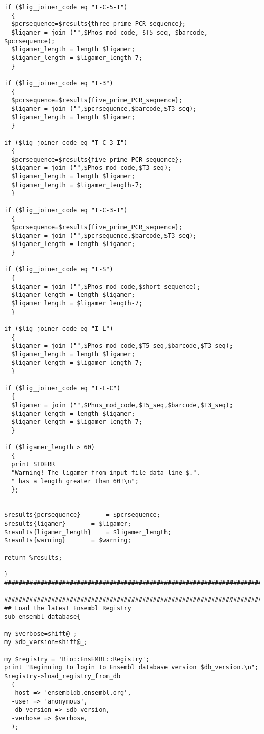 \begin{lstlisting}
if ($lig_joiner_code eq "T-C-5-T")
  {
  $pcrsequence=$results{three_prime_PCR_sequence};
  $ligamer = join ("",$Phos_mod_code, $T5_seq, $barcode, $pcrsequence);
  $ligamer_length = length $ligamer;
  $ligamer_length = $ligamer_length-7;
  }

if ($lig_joiner_code eq "T-3")
  {
  $pcrsequence=$results{five_prime_PCR_sequence};
  $ligamer = join ("",$pcrsequence,$barcode,$T3_seq);
  $ligamer_length = length $ligamer;
  }

if ($lig_joiner_code eq "T-C-3-I")
  {
  $pcrsequence=$results{five_prime_PCR_sequence};
  $ligamer = join ("",$Phos_mod_code,$T3_seq);
  $ligamer_length = length $ligamer;
  $ligamer_length = $ligamer_length-7;
  }

if ($lig_joiner_code eq "T-C-3-T")
  {
  $pcrsequence=$results{five_prime_PCR_sequence};
  $ligamer = join ("",$pcrsequence,$barcode,$T3_seq);
  $ligamer_length = length $ligamer;
  }

if ($lig_joiner_code eq "I-S")
  {
  $ligamer = join ("",$Phos_mod_code,$short_sequence);
  $ligamer_length = length $ligamer;
  $ligamer_length = $ligamer_length-7;
  }

if ($lig_joiner_code eq "I-L")
  {
  $ligamer = join ("",$Phos_mod_code,$T5_seq,$barcode,$T3_seq);
  $ligamer_length = length $ligamer;
  $ligamer_length = $ligamer_length-7;
  }

if ($lig_joiner_code eq "I-L-C")
  {
  $ligamer = join ("",$Phos_mod_code,$T5_seq,$barcode,$T3_seq);
  $ligamer_length = length $ligamer;
  $ligamer_length = $ligamer_length-7;
  }

if ($ligamer_length > 60)
  {
  print STDERR
  "Warning! The ligamer from input file data line $.".
  " has a length greater than 60!\n";
  };


$results{pcrsequence}		= $pcrsequence;
$results{ligamer}		= $ligamer;
$results{ligamer_length}	= $ligamer_length;
$results{warning}		= $warning;

return %results;

}
################################################################################

################################################################################
## Load the latest Ensembl Registry
sub ensembl_database{

my $verbose=shift@_;
my $db_version=shift@_;

my $registry = 'Bio::EnsEMBL::Registry';
print "Beginning to login to Ensembl database version $db_version.\n";
$registry->load_registry_from_db
  (
  -host => 'ensembldb.ensembl.org',
  -user => 'anonymous',
  -db_version => $db_version,
  -verbose => $verbose,
  );


\end{lstlisting}
